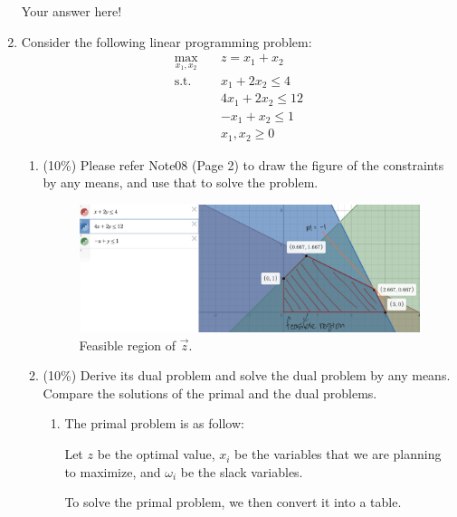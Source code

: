 \documentclass[a4paper,10pt]{article}
\begin{document}
\begin{enumerate}
{\color{blue}
    Your answer here!
}

\item Consider the following linear programming problem:
    \begin{equation}
        \begin{aligned}
            \max_{x_1,x_2} \quad & z=x_1+x_2 \\
            \textrm{s.t.} \quad & x_1 + 2x_2 \le 4  \\
                \quad& 4x_1 + 2x_2 \le 12   \\
                \quad& -x_1 + x_2 \le 1   \\
                \quad& x_1, x_2 \ge 0
        \end{aligned}
    \end{equation}

    \begin{enumerate}
        \item (10\%) Please refer Note08 (Page 2) to draw the figure of the constraints by any means, and use that to solve the problem. 
        \begin{figure}[H]
            \centering
            \includegraphics[scale=0.15]{./4a.png}
            \caption{Feasible region of $\vec{z}$.}
        \end{figure}

        \item (10\%) Derive its dual problem and solve the dual problem by any means. Compare the solutions of the primal and the dual problems.
        {\color{blue} 
            \begin{enumerate}
            \item The primal problem is as follow:

                Let $z$ be the optimal value, $x_i$ be the variables that we are planning to maximize, and $\omega_i$ be the slack variables.
                
                To solve the primal problem, we then convert it into a table. 
    

\end{enumerate}}
\end{enumerate}
\end{enumerate}
\end{document}
